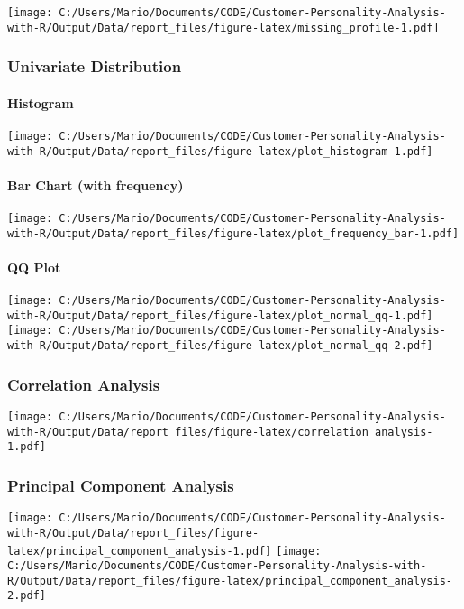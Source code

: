 \documentclass[
]{article}
\begin{document}
\texttt{[image: C:/Users/Mario/Documents/CODE/Customer-Personality-Analysis-with-R/Output/Data/report\_files/figure-latex/missing\_profile-1.pdf]}

\hypertarget{univariate-distribution}{%
\subsubsection{Univariate Distribution}\label{univariate-distribution}}

\hypertarget{histogram}{%
\paragraph{Histogram}\label{histogram}}

\texttt{[image: C:/Users/Mario/Documents/CODE/Customer-Personality-Analysis-with-R/Output/Data/report\_files/figure-latex/plot\_histogram-1.pdf]}

\hypertarget{bar-chart-with-frequency}{%
\paragraph{Bar Chart (with frequency)}\label{bar-chart-with-frequency}}

\texttt{[image: C:/Users/Mario/Documents/CODE/Customer-Personality-Analysis-with-R/Output/Data/report\_files/figure-latex/plot\_frequency\_bar-1.pdf]}

\hypertarget{qq-plot}{%
\paragraph{QQ Plot}\label{qq-plot}}

\texttt{[image: C:/Users/Mario/Documents/CODE/Customer-Personality-Analysis-with-R/Output/Data/report\_files/figure-latex/plot\_normal\_qq-1.pdf]}
\texttt{[image: C:/Users/Mario/Documents/CODE/Customer-Personality-Analysis-with-R/Output/Data/report\_files/figure-latex/plot\_normal\_qq-2.pdf]}

\hypertarget{correlation-analysis}{%
\subsubsection{Correlation Analysis}\label{correlation-analysis}}

\texttt{[image: C:/Users/Mario/Documents/CODE/Customer-Personality-Analysis-with-R/Output/Data/report\_files/figure-latex/correlation\_analysis-1.pdf]}

\hypertarget{principal-component-analysis}{%
\subsubsection{Principal Component
Analysis}\label{principal-component-analysis}}

\texttt{[image: C:/Users/Mario/Documents/CODE/Customer-Personality-Analysis-with-R/Output/Data/report\_files/figure-latex/principal\_component\_analysis-1.pdf]}
\texttt{[image: C:/Users/Mario/Documents/CODE/Customer-Personality-Analysis-with-R/Output/Data/report\_files/figure-latex/principal\_component\_analysis-2.pdf]}
\end{document}
